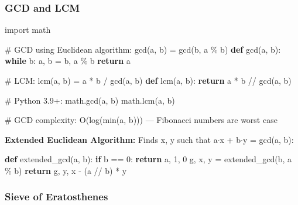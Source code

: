 \documentclass[11pt]{article}
\newenvironment{Shaded}{\begin{snugshade}}{\end{snugshade}}
\newcommand{\CommentTok}[1]{\textcolor[rgb]{0.48,0.49,0.49}{#1}}
\newcommand{\ControlFlowTok}[1]{\textcolor[rgb]{0.99,0.74,0.29}{\textbf{#1}}}
\newcommand{\DecValTok}[1]{\textcolor[rgb]{0.96,0.45,0.00}{#1}}
\newcommand{\ImportTok}[1]{\textcolor[rgb]{0.15,0.68,0.38}{#1}}
\newcommand{\KeywordTok}[1]{\textcolor[rgb]{0.81,0.81,0.76}{\textbf{#1}}}
\newcommand{\NormalTok}[1]{\textcolor[rgb]{0.81,0.81,0.76}{#1}}
\newcommand{\OperatorTok}[1]{\textcolor[rgb]{0.81,0.81,0.76}{#1}}
\begin{document}
\subsubsection{GCD and LCM}\label{gcd-and-lcm}


\begin{Shaded}
\begin{Highlighting}[]
\ImportTok{import}\NormalTok{ math}

\CommentTok{\# GCD using Euclidean algorithm: gcd(a, b) = gcd(b, a \% b)}
\KeywordTok{def}\NormalTok{ gcd(a, b):}
    \ControlFlowTok{while}\NormalTok{ b:}
\NormalTok{        a, b }\OperatorTok{=}\NormalTok{ b, a }\OperatorTok{\%}\NormalTok{ b}
    \ControlFlowTok{return}\NormalTok{ a}

\CommentTok{\# LCM: lcm(a, b) = a * b / gcd(a, b)}
\KeywordTok{def}\NormalTok{ lcm(a, b):}
    \ControlFlowTok{return}\NormalTok{ a }\OperatorTok{*}\NormalTok{ b }\OperatorTok{//}\NormalTok{ gcd(a, b)}

\CommentTok{\# Python 3.9+:}
\NormalTok{math.gcd(a, b)}
\NormalTok{math.lcm(a, b)}

\CommentTok{\# GCD complexity: O(log(min(a, b))) — Fibonacci numbers are worst case}
\end{Highlighting}
\end{Shaded}

\textbf{Extended Euclidean Algorithm:} Finds x, y such that a\(\cdot\)x + b\(\cdot\)y = gcd(a, b):


\begin{Shaded}
\begin{Highlighting}[]
\KeywordTok{def}\NormalTok{ extended\_gcd(a, b):}
    \ControlFlowTok{if}\NormalTok{ b }\OperatorTok{==} \DecValTok{0}\NormalTok{:}
        \ControlFlowTok{return}\NormalTok{ a, }\DecValTok{1}\NormalTok{, }\DecValTok{0}
\NormalTok{    g, x, y }\OperatorTok{=}\NormalTok{ extended\_gcd(b, a }\OperatorTok{\%}\NormalTok{ b)}
    \ControlFlowTok{return}\NormalTok{ g, y, x }\OperatorTok{{-}}\NormalTok{ (a }\OperatorTok{//}\NormalTok{ b) }\OperatorTok{*}\NormalTok{ y}
\end{Highlighting}
\end{Shaded}

\subsubsection{Sieve of Eratosthenes}\label{sieve-of-eratosthenes}
\end{document}
